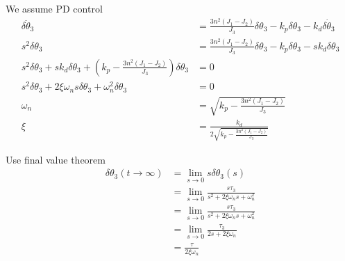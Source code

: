 \documentclass[]{article}
\begin{document}
We assume PD control
\begin{align}
	\delta \ddot{\theta}_3 & = \frac{3n^2(J_1 - J_2)}{J_3} \delta \theta_3 - k_p \delta \theta_3 - k_d \delta \dot{\theta}_3 \\
	s^2 \delta \theta_3 & = \frac{3n^2(J_1 - J_2)}{J_3} \delta \theta_3 - k_p \delta \theta_3 - s k_d \delta \theta_3 \\
	s^2 \delta \theta_3 + s k_d \delta \theta_3 + \left(k_p - \frac{3n^2(J_1 - J_2)}{J_3}\right) \delta \theta_3  & = 0 \\
	s^2 \delta \theta_3 + 2 \xi \omega_n s \delta \theta_3 + \omega_n^2 \delta \theta_3  & = 0 \\
	\omega_n & = \sqrt{k_p - \frac{3n^2(J_1 - J_2)}{J_3}} \\
	\xi & = \frac{k_d}{2 \sqrt{k_p - \frac{3n^2(J_1 - J_2)}{J_3}}}
\end{align}

Use final value theorem
\begin{align}
	\delta \theta_3 (t \rightarrow \infty) & = \lim_{s \rightarrow 0} s \delta \theta_3(s) \\
	& = \lim_{s \rightarrow 0} \frac{s \tau_3}{s^2 + 2\xi \omega_n s + \omega_n^2} \\
	& = \lim_{s \rightarrow 0} \frac{s \tau_3}{s^2 + 2\xi \omega_n s + \omega_n^2} \\
	& = \lim_{s \rightarrow 0} \frac{\tau_3}{2s + 2\xi \omega_n} \\
	& = \frac{\tau}{2 \xi \omega_n}
\end{align}
\end{document}
